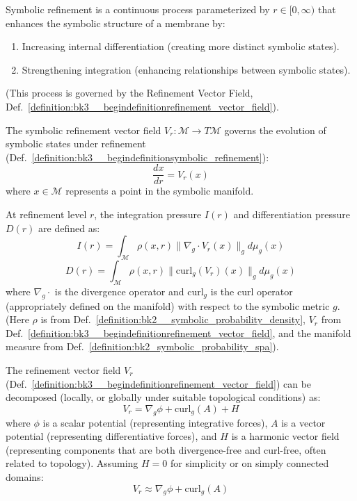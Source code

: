 \begin{definition} \label{definition:bk3__begindefinitionsymbolic_refinement}
Symbolic refinement is a continuous process parameterized by $r \in [0, \infty)$ that enhances the symbolic structure of a membrane by:
\begin{enumerate}
    \item Increasing internal differentiation (creating more distinct symbolic states).
    \item Strengthening integration (enhancing relationships between symbolic states).
\end{enumerate}
(This process is governed by the Refinement Vector Field, Def.~\ref{definition:bk3__begindefinitionrefinement_vector_field}).
\end{definition}

\begin{definition} \label{definition:bk3__begindefinitionrefinement_vector_field}
The symbolic refinement vector field $V_r: \mathcal{M} \rightarrow T\mathcal{M}$ governs the evolution of symbolic states under refinement (Def.~\ref{definition:bk3__begindefinitionsymbolic_refinement}):
\[
\frac{dx}{dr} = V_r(x)
\]
where $x \in \mathcal{M}$ represents a point in the symbolic manifold.
\end{definition}

\begin{definition} \label{def:bk3_integration_differentiation_pressures}
At refinement level $r$, the integration pressure $I(r)$ and differentiation pressure $D(r)$ are defined as:
\[
I(r) = \int_{\mathcal{M}} \rho(x,r) \|\nabla_g \cdot V_r(x)\|_g d\mu_g(x)
\]
\[
D(r) = \int_{\mathcal{M}} \rho(x,r) \|\text{curl}_g(V_r)(x)\|_g d\mu_g(x)
\]
where $\nabla_g \cdot$ is the divergence operator and $\text{curl}_g$ is the curl operator (appropriately defined on the manifold) with respect to the symbolic metric $g$. (Here $\rho$ is from Def.~\ref{definition:bk2__symbolic_probability_density}, $V_r$ from Def.~\ref{definition:bk3__begindefinitionrefinement_vector_field}, and the manifold measure from Def.~\ref{definition:bk2_symbolic_probability_spa}).
\end{definition}

\begin{lemma} \label{lem:bk3_helmholtz_decomposition_refinement_field}
The refinement vector field $V_r$ (Def.~\ref{definition:bk3__begindefinitionrefinement_vector_field}) can be decomposed (locally, or globally under suitable topological conditions) as:
\[
V_r = \nabla_g \phi + \text{curl}_g(A) + H
\]
where $\phi$ is a scalar potential (representing integrative forces), $A$ is a vector potential (representing differentiative forces), and $H$ is a harmonic vector field (representing components that are both divergence-free and curl-free, often related to topology). Assuming $H=0$ for simplicity or on simply connected domains:
\[
V_r \approx \nabla_g \phi + \text{curl}_g(A)
\]
\end{lemma}

